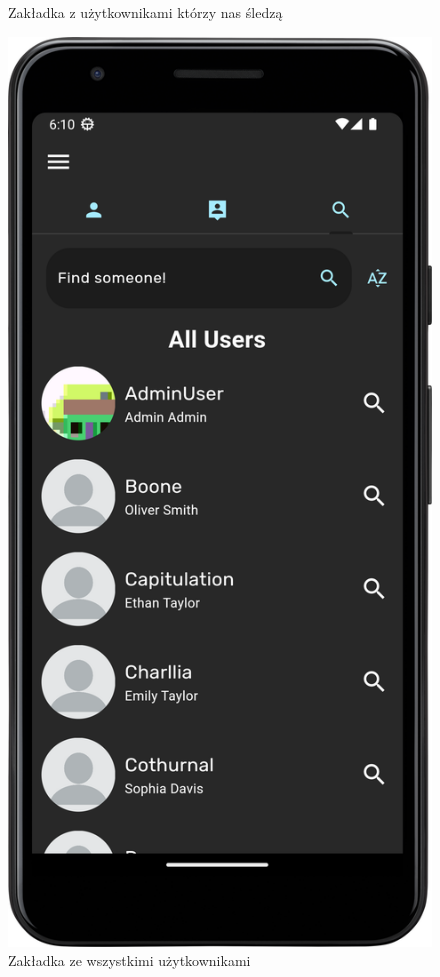 \documentclass[a4paper,twoside,12pt]{book}
\begin{document}
\begin{figure}[H]
\begin{minipage}[b]{0.30\textwidth}
    \caption{Zakładka z użytkownikami którzy nas śledzą}
  \end{minipage}
  \hfill
  \begin{minipage}[b]{0.30\textwidth}
    \includegraphics[width=\textwidth]{mobile_ss/wszyscyUzytkownicy.png}
    \caption{Zakładka ze wszystkimi użytkownikami\\}
  \end{minipage}
\end{figure}
\end{document}
